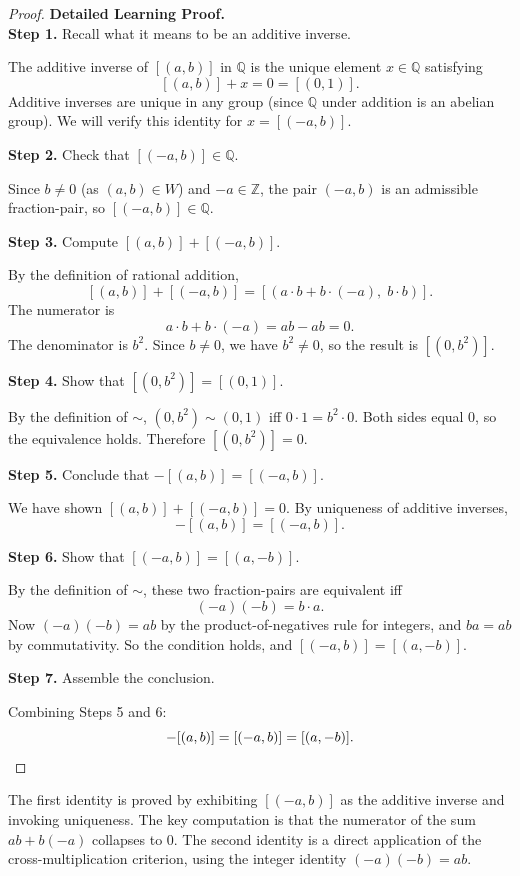 \begin{proof}
\textbf{Detailed Learning Proof.}~\\

\textbf{Step 1.} Recall what it means to be an additive inverse.

The additive inverse of $[(a,b)]$ in $\mathbb{Q}$ is the unique element
$x\in\mathbb{Q}$ satisfying
\[
[(a,b)] + x = 0 = [(0,1)].
\]
Additive inverses are unique in any group (since $\mathbb{Q}$ under
addition is an abelian group). We will verify this identity for
$x = [(-a,b)]$.

\textbf{Step 2.} Check that $[(-a,b)]\in\mathbb{Q}$.

Since $b\neq 0$ (as $(a,b)\in W$) and $-a\in\mathbb{Z}$, the pair
$(-a,b)$ is an admissible fraction-pair, so $[(-a,b)]\in\mathbb{Q}$.

\textbf{Step 3.} Compute $[(a,b)] + [(-a,b)]$.

By the definition of rational addition,
\[
[(a,b)] + [(-a,b)]
= [(a\cdot b + b\cdot(-a),\; b\cdot b)].
\]
The numerator is
\[
a\cdot b + b\cdot(-a) = ab - ab = 0.
\]
The denominator is $b^2$. Since $b\neq 0$, we have $b^2\neq 0$, so the
result is $[(0,b^2)]$.

\textbf{Step 4.} Show that $[(0,b^2)] = [(0,1)]$.

By the definition of $\sim$, $(0,b^2)\sim(0,1)$ iff $0\cdot 1 = b^2\cdot 0$.
Both sides equal $0$, so the equivalence holds. Therefore $[(0,b^2)] = 0$.

\textbf{Step 5.} Conclude that $-[(a,b)] = [(-a,b)]$.

We have shown $[(a,b)] + [(-a,b)] = 0$. By uniqueness of additive inverses,
\[
-[(a,b)] = [(-a,b)].
\]

\textbf{Step 6.} Show that $[(-a,b)] = [(a,-b)]$.

By the definition of $\sim$, these two fraction-pairs are equivalent iff
\[
(-a)(-b) = b\cdot a.
\]
Now $(-a)(-b) = ab$ by the product-of-negatives rule for integers, and
$ba = ab$ by commutativity. So the condition holds, and $[(-a,b)] = [(a,-b)]$.

\textbf{Step 7.} Assemble the conclusion.

Combining Steps 5 and 6:
\[
-[(a,b)] = [(-a,b)] = [(a,-b)]. \qedhere
\]
\end{proof}

\begin{remark*}
The first identity is proved by exhibiting $[(-a,b)]$ as the additive
inverse and invoking uniqueness. The key computation is that the numerator
of the sum $ab + b(-a)$ collapses to $0$. The second identity is a direct
application of the cross-multiplication criterion, using the integer identity
$(-a)(-b) = ab$.
\end{remark*}

